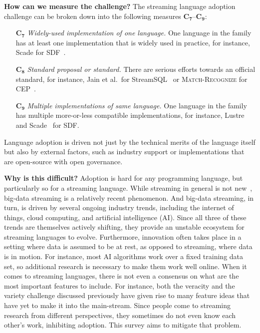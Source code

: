 \textbf{How can we measure the challenge?}
%
The streaming language  adoption challenge can be broken down
into the following measures $\mathbf{C_7}$--$\mathbf{C_9}$:

\begin{itemize}[leftmargin=6mm]
  \item[$\mathbf{C_7}$] \emph{Widely-used implementation of one
    language.}  One language in the family has at least one
    implementation that is widely used in practice, for instance,
    Scade for SDF~\cite{scade_2017}.
  \item[$\mathbf{C_8}$] \emph{Standard proposal or standard.}  There
    are serious efforts towards an official standard, for instance,
    Jain et al.\ for StreamSQL~\cite{jain_et_al_2008} or
    \textsc{Match-Recognize} for CEP~\cite{zemke_et_al_2007}.
  \item[$\mathbf{C_9}$] \emph{Multiple implementations of same
    language.}  One language in the family has multiple more-or-less
    compatible implementations, for instance,
    Lustre~\cite{lustre_1987} and Scade~\cite{scade_2017} for SDF.
\end{itemize}

Language adoption is driven not just by the technical merits of the
language itself but also by external factors, such as industry support
or implementations that are open-source with open governance.

\textbf{Why is this difficult?}
%
Adoption is hard for any programming language, but 
particularly so for a streaming language. While streaming in general
is not new~\cite{stephens_1997}, big-data streaming is a relatively
recent phenomenon. And big-data streaming, in turn, is driven by
several ongoing industry trends, including the internet of things,
cloud computing, and artificial intelligence (AI). Since all three of these
trends are themselves actively shifting, they provide an unstable
ecosystem for streaming languages to evolve. Furthermore,
innovation often takes place in a setting where data is assumed to be
at rest, as opposed to streaming, where data is in motion. For
instance, most AI algorithms work over a fixed training data set, so
additional research is necessary to make them work well online.  When
it comes to streaming languages, there is not even a consensus on what
are the most important features to include. For instance, both the
veracity and the variety challenge discussed previously have given
rise to many feature ideas that have yet to make it into the
main-stream.  Since people come to streaming research from different
perspectives, they sometimes do not even know each other's work,
inhibiting adoption. This survey aims to mitigate that problem.
